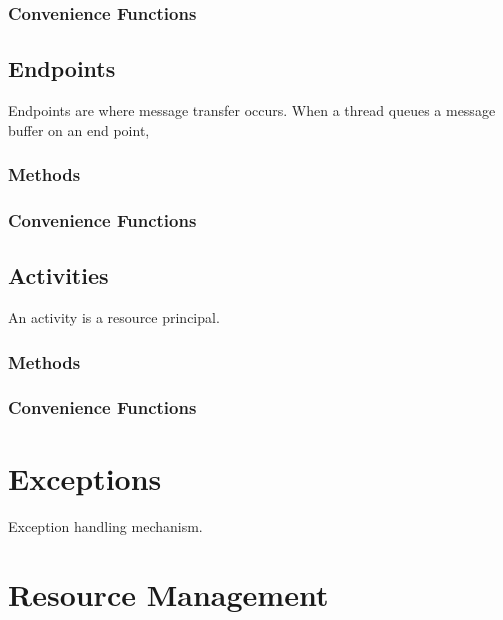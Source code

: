 \subsection{Convenience Functions}

\clearpage
\section{Endpoints}

Endpoints are where message transfer occurs.  When a thread queues a
message buffer on an end point, 

\subsection{Methods}

\subsection{Convenience Functions}

\clearpage
\section{Activities}

An activity is a resource principal.

\subsection{Methods}

\subsection{Convenience Functions}

\chapter{Exceptions}

Exception handling mechanism.

\chapter{Resource Management}
